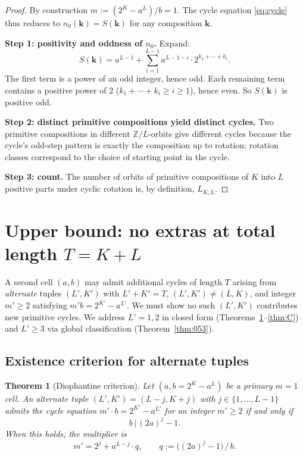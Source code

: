 \documentclass[11pt]{amsart}
\theoremstyle{plain}
\newtheorem{theorem}{Theorem}
\theoremstyle{definition}
\begin{document}
\begin{proof}
By construction $m := (2^K - a^L)/b = 1$. The cycle equation
\eqref{eq:cycle} thus reduces to $n_0(\mathbf{k}) = S(\mathbf{k})$
for any composition $\mathbf{k}$.

\textbf{Step 1: positivity and oddness of $n_0$.} Expand:
\[
S(\mathbf{k}) = a^{L-1} + \sum_{i=1}^{L-1} a^{L-1-i} \cdot 2^{k_1 + \cdots + k_i}.
\]
The first term is a power of an odd integer, hence odd. Each
remaining term contains a positive power of 2 ($k_1 + \cdots + k_i
\geq i \geq 1$), hence even. So $S(\mathbf{k})$ is positive odd.

\textbf{Step 2: distinct primitive compositions yield distinct cycles.}
Two primitive compositions in different $\mathbb{Z}/L$-orbits give
different cycles because the cycle's odd-step pattern is exactly the
composition up to rotation; rotation classes correspond to the choice
of starting point in the cycle.

\textbf{Step 3: count.} The number of orbits of primitive compositions
of $K$ into $L$ positive parts under cyclic rotation is, by
definition, $L_{K,L}$.
\end{proof}

\section{Upper bound: no extras at total length $T = K + L$}
\label{sec:upper}

A second cell $(a, b)$ may admit additional cycles of length $T$
arising from \emph{alternate} tuples $(L', K')$ with $L' + K' = T$,
$(L', K') \neq (L, K)$, and integer $m' \geq 2$ satisfying
$m' b = 2^{K'} - a^{L'}$. We must show no such $(L', K')$ contributes
new primitive cycles. We address $L' = 1, 2$ in closed form
(Theorems~\ref{thm:A}--\ref{thm:C}) and $L' \geq 3$ via global
classification (Theorem~\ref{thm:053}).

\subsection{Existence criterion for alternate tuples}

\begin{theorem}[Diophantine criterion] \label{thm:A}
Let $(a, b = 2^K - a^L)$ be a primary $m=1$ cell. An alternate tuple
$(L', K') = (L - j, K + j)$ with $j \in \{1, \dots, L-1\}$ admits the
cycle equation $m' \cdot b = 2^{K'} - a^{L'}$ for an integer
$m' \geq 2$ if and only if
\[
b \,\Big|\, (2a)^j - 1.
\]
When this holds, the multiplier is
\[
m' = 2^j + a^{L-j} \cdot q, \qquad q := \big((2a)^j - 1\big)\,\big/\,b.
\]
\end{theorem}
\end{document}
